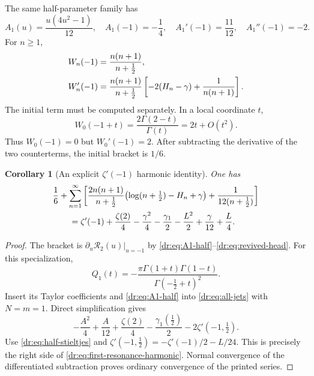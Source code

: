 \documentclass[11pt,letterpaper]{article}
\numberwithin{equation}{section}
\newtheorem{corollary}[theorem]{Corollary}
\theoremstyle{definition}
\theoremstyle{remark}
\newcommand{\Rcal}{\mathcal R}
\begin{document}
The same half-parameter family has
\begin{equation}
 A_1(u)=\frac{u(4u^2-1)}{12},\quad
 A_1(-1)=-\frac14,\quad A_1'(-1)=\frac{11}{12},\quad
 A_1''(-1)=-2.
 \label{dr:eq:A1-half}
\end{equation}
For $n\geq1$,
\begin{align}
 W_n(-1)&=\frac{n(n+1)}{n+\tfrac12},\notag\\
 W_n'(-1)&=\frac{n(n+1)}{n+\tfrac12}
       \left[-2(H_n-\gamma)+\frac1{n(n+1)}\right].
 \label{dr:eq:W1-half}
\end{align}
The initial term must be computed separately. In a local coordinate $t$,
\begin{equation}
 W_0(-1+t)=\frac{2\Gamma(2-t)}{\Gamma(t)}=2t+O(t^2).
 \label{dr:eq:revived-head}
\end{equation}
Thus $W_0(-1)=0$ but $W_0'(-1)=2$. After subtracting the derivative
of the two counterterms, the initial bracket is $1/6$.

\begin{corollary}[An explicit $\zeta'(-1)$ harmonic identity]
\label{dr:cor:first-resonance}
One has
\begin{align}
 &\frac16+\sum_{n=1}^{\infty}
 \left[\frac{2n(n+1)}{n+\tfrac12}
       \bigl(\log(n+\tfrac12)-H_n+\gamma\bigr)
       +\frac1{12(n+\tfrac12)}\right]\notag\\
 &\qquad=\zeta'(-1)+\frac{\zeta(2)}4-\frac{\gamma^2}4
        -\frac{\gamma_1}2-\frac{L^2}2+\frac\gamma{12}+\frac L4.
 \label{dr:eq:first-resonance-harmonic}
\end{align}
\end{corollary}

\begin{proof}
The bracket is $\partial_u\Rcal_2(u)|_{u=-1}$ by
\eqref{dr:eq:A1-half}--\eqref{dr:eq:revived-head}. For this specialization,
\begin{equation}
 Q_1(t)=-\frac{\pi\Gamma(1+t)\Gamma(1-t)}{\Gamma(-\tfrac12+t)^2}.
 \label{dr:eq:Q1-half}
\end{equation}
Insert its Taylor coefficients and \eqref{dr:eq:A1-half} into
\eqref{dr:eq:all-jets} with $N=m=1$. Direct simplification gives
\[
 -\frac{A^2}{4}+\frac A{12}+\frac{\zeta(2)}4
 -\frac{\gamma_1(\tfrac12)}2-2\zeta'(-1,\tfrac12).
\]
Use \eqref{dr:eq:half-stieltjes} and
$\zeta'(-1,\tfrac12)=-\zeta'(-1)/2-L/24$. This is precisely the
right side of \eqref{dr:eq:first-resonance-harmonic}. Normal convergence
of the differentiated subtraction proves ordinary convergence of the
printed series.
\end{proof}
\end{document}
